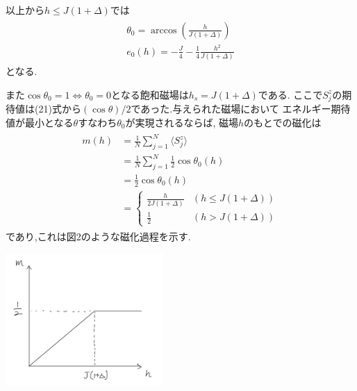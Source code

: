 \documentclass[uplatex,a4j,11pt,dvipdfmx]{jsarticle}
\makeatletter
\def\fgcaption{\def\@captype{figure}\caption}
\def\fgcaption{\def\@captype{figure}\caption}
\makeatother
\begin{document}
以上から$h\leq J(1+\Delta)$では
\begin{align}
  \begin{split}
    \theta_0=\arccos\left(\frac{h}{J(1+\Delta)}\right)\\
    e_0(h)=-\frac{J}{4}-\frac{1}{4}\frac{h^2}{J(1+\Delta)}
  \end{split}
\end{align}
となる.

また$\cos\theta_0=1\iff\theta_0=0$となる飽和磁場は$h_s=J(1+\Delta)$である.
ここで$S_j^z$の期待値は(21)式から$(\cos\theta)/2$であった.与えられた磁場において
エネルギー期待値が最小となる$\theta$すなわち$\theta_0$が実現されるならば, 磁場$h$のもとでの磁化は
\begin{align}
  \begin{split}
    m(h)&=\frac{1}{N}\sum_{j=1}^N\langle S_j^z\rangle\\
    &=\frac{1}{N}\sum_{j=1}^N\frac{1}{2}\cos\theta_0(h)\\
    &=\frac{1}{2}\cos\theta_0(h)\\
    &=\left\{
      \begin{array}{cc}
        \frac{h}{2J(1+\Delta)}&(h\leq J(1+\Delta))\\
        \frac{1}{2}&(h>J(1+\Delta))
      \end{array}\right.
  \end{split}
\end{align}
であり,これは図2のような磁化過程を示す.
\begin{center}
  \includegraphics[width=6cm]{jika_1.png}
  \fgcaption{磁化過程}
\end{center}
\end{document}
